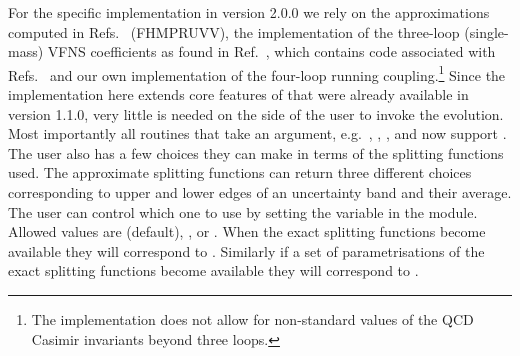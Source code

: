 For the specific implementation in \hoppet version 2.0.0 we rely on
the approximations computed in
Refs.~\cite{Davies:2016jie,Moch:2017uml,Falcioni:2023luc,Falcioni:2023vqq,Moch:2023tdj,Falcioni:2024xyt,Falcioni:2024qpd} (FHMPRUVV),
the implementation of the three-loop (single-mass) VFNS coefficients as found in
Ref.~\cite{BlumleinCode}, which contains code associated with
Refs.~\cite{Ablinger:2024xtt,Fael:2022miw} and our own implementation
of the four-loop running coupling.\footnote{The implementation does
not allow for non-standard values of the QCD Casimir invariants beyond
three loops.}
%
Since the implementation here extends core features of \hoppet that
were already available in version 1.1.0, very little is needed on the
side of the user to invoke the evolution.
%
Most importantly all routines that take an  argument,
e.g.\ , ,
, and  now support .
%
The user also has a few choices they can make in terms of the
splitting functions used.
%
The approximate splitting functions can return
three different
choices corresponding to upper and lower edges of an uncertainty band and their
average. 
%
The user can control which one to use by setting the
 variable in the
 module.
%
Allowed values are
 (default),
, or .
%
When the exact splitting functions become available they will
correspond to .
%
Similarly if a set of parametrisations of the exact splitting
functions become available they will correspond to
.

